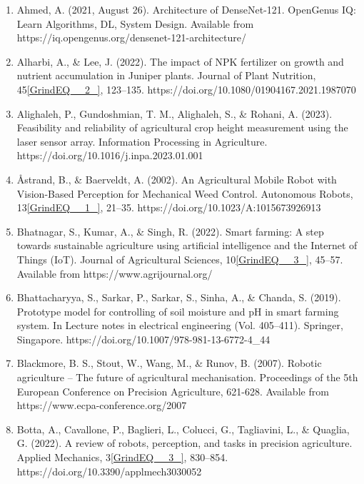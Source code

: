 \documentclass{book} %
\begin{document}
\begin{enumerate}
\item  Ahmed, A. (2021, August 26). Architecture of DenseNet-121. OpenGenus IQ: Learn Algorithms, DL, System Design. Available from https://iq.opengenus.org/densenet-121-architecture/

\item  Alharbi, A., \& Lee, J. (2022). The impact of NPK fertilizer on growth and nutrient accumulation in Juniper plants. Journal of Plant Nutrition, 45\eqref{GrindEQ__2_}, 123--135. https://doi.org/10.1080/01904167.2021.1987070

\item  Alighaleh, P., Gundoshmian, T. M., Alighaleh, S., \& Rohani, A. (2023). Feasibility and reliability of agricultural crop height measurement using the laser sensor array. Information Processing in Agriculture. https://doi.org/10.1016/j.inpa.2023.01.001

\item  {\AA}strand, B., \& Baerveldt, A. (2002). An Agricultural Mobile Robot with Vision-Based Perception for Mechanical Weed Control. Autonomous Robots, 13\eqref{GrindEQ__1_}, 21--35. https://doi.org/10.1023/A:1015673926913

\item  Bhatnagar, S., Kumar, A., \& Singh, R. (2022). Smart farming: A step towards sustainable agriculture using artificial intelligence and the Internet of Things (IoT). Journal of Agricultural Sciences, 10\eqref{GrindEQ__3_}, 45--57. Available from https://www.agrijournal.org/

\item  Bhattacharyya, S., Sarkar, P., Sarkar, S., Sinha, A., \& Chanda, S. (2019). Prototype model for controlling of soil moisture and pH in smart farming system. In Lecture notes in electrical engineering (Vol. 405--411). Springer, Singapore. https://doi.org/10.1007/978-981-13-6772-4\_44

\item  Blackmore, B. S., Stout, W., Wang, M., \& Runov, B. (2007). Robotic agriculture -- The future of agricultural mechanisation. Proceedings of the 5th European Conference on Precision Agriculture, 621-628. Available from https://www.ecpa-conference.org/2007

\item  Botta, A., Cavallone, P., Baglieri, L., Colucci, G., Tagliavini, L., \& Quaglia, G. (2022). A review of robots, perception, and tasks in precision agriculture. Applied Mechanics, 3\eqref{GrindEQ__3_}, 830--854. https://doi.org/10.3390/applmech3030052


\end{enumerate}
\end{document}
